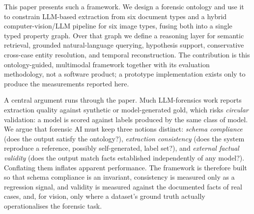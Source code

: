 \documentclass[conference]{IEEEtran}
\begin{document}
This paper presents such a framework. We design a forensic ontology and use it
to constrain LLM-based extraction from six document types and a hybrid
computer-vision/LLM pipeline for six image types, fusing both into a single typed
property graph. Over that graph we define a reasoning layer for semantic
retrieval, grounded natural-language querying, hypothesis support, conservative
cross-case entity resolution, and temporal reconstruction. The
contribution is this ontology-guided, multimodal framework together with its
evaluation methodology, not a software product; a prototype implementation
exists only to produce the measurements reported here.

A central argument runs through the paper. Much LLM-forensics work reports
extraction quality against synthetic or model-generated gold, which risks
\emph{circular} validation: a model is scored against labels produced by the same
class of model. We argue that forensic AI must keep three notions distinct:
\emph{schema compliance} (does the output satisfy the ontology?), \emph{extraction
consistency} (does the system reproduce a reference, possibly self-generated,
label set?), and \emph{external factual validity} (does the output match facts
established independently of any model?). Conflating them inflates apparent
performance. The framework is therefore built so that schema compliance is an
invariant, consistency is measured only as a regression signal, and validity is
measured against the documented facts of real cases, and, for vision, only where
a dataset's ground truth actually operationalises the forensic task.
\end{document}

